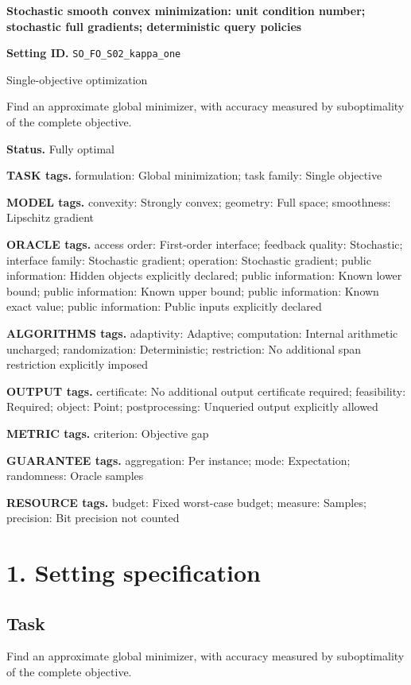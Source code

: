 \documentclass[10pt,a4paper]{article}
\begin{document}
\raggedright

{\LARGE\bfseries\sffamily\color{AtlasNavy} Stochastic smooth convex minimization: unit condition number; stochastic full gradients; deterministic query policies\par}\vspace{5pt}
\textbf{Setting ID.} \texttt{SO\_\allowbreak{}FO\_\allowbreak{}S02\_\allowbreak{}kappa\_\allowbreak{}one}

Single-objective optimization

Find an approximate global minimizer, with accuracy measured by suboptimality of the complete objective.

\textbf{Status.} Fully optimal

\textbf{TASK tags.} formulation: Global minimization; task family: Single objective

\textbf{MODEL tags.} convexity: Strongly convex; geometry: Full space; smoothness: Lipschitz gradient

\textbf{ORACLE tags.} access order: First-order interface; feedback quality: Stochastic; interface family: Stochastic gradient; operation: Stochastic gradient; public information: Hidden objects explicitly declared; public information: Known lower bound; public information: Known upper bound; public information: Known exact value; public information: Public inputs explicitly declared

\textbf{ALGORITHMS tags.} adaptivity: Adaptive; computation: Internal arithmetic uncharged; randomization: Deterministic; restriction: No additional span restriction explicitly imposed

\textbf{OUTPUT tags.} certificate: No additional output certificate required; feasibility: Required; object: Point; postprocessing: Unqueried output explicitly allowed

\textbf{METRIC tags.} criterion: Objective gap

\textbf{GUARANTEE tags.} aggregation: Per instance; mode: Expectation; randomness: Oracle samples

\textbf{RESOURCE tags.} budget: Fixed worst-case budget; measure: Samples; precision: Bit precision not counted

\section{1. Setting specification}
\subsection{Task}
Find an approximate global minimizer, with accuracy measured by suboptimality of the complete objective.
\end{document}
